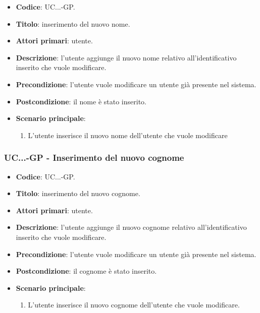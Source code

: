 				\begin{itemize}
					\item \textbf{Codice}: UC\theuccount.\thesubuccount.\thesubsubuccount.\thesubsubsubuccount-GP.
					\item \textbf{Titolo}: inserimento del nuovo nome.
					\item \textbf{Attori primari}: utente.
					\item \textbf{Descrizione}: l'utente aggiunge il nuovo nome relativo all'identificativo inserito che vuole modificare.
					\item \textbf{Precondizione}: l'utente vuole modificare un utente già presente nel sistema.
					\item \textbf{Postcondizione}: il nome è stato inserito.
					\item \textbf{Scenario principale}:
					\begin{enumerate}
						\item L'utente inserisce il nuovo nome dell'utente che vuole modificare
					\end{enumerate}
				\end{itemize}
			
			\subsubsection{UC\theuccount.\thesubuccount.\thesubsubuccount.\thesubsubsubuccount-GP - Inserimento del nuovo cognome}
				
				\begin{itemize}
					\item \textbf{Codice}: UC\theuccount.\thesubuccount.\thesubsubuccount.\thesubsubsubuccount-GP.
					\item \textbf{Titolo}: inserimento del nuovo cognome.
					\item \textbf{Attori primari}: utente.
					\item \textbf{Descrizione}: l'utente aggiunge il nuovo cognome relativo all'identificativo inserito che vuole modificare.
					\item \textbf{Precondizione}: l'utente vuole modificare un utente già presente nel sistema.
					\item \textbf{Postcondizione}: il cognome è stato inserito.
					\item \textbf{Scenario principale}:
					\begin{enumerate}
						\item L'utente inserisce il nuovo cognome dell'utente che vuole modificare.
					\end{enumerate}
				\end{itemize}
			
